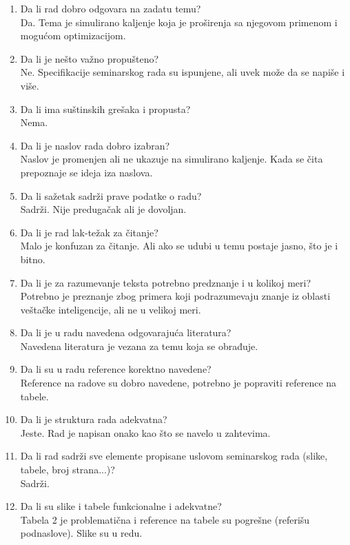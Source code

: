 \documentclass[a4paper]{report}
\begin{document}
\begin{enumerate}
\item Da li rad dobro odgovara na zadatu temu?\\
Da. Tema je simulirano kaljenje koja je proširenja sa njegovom primenom i mogućom optimizacijom.
\item Da li je nešto važno propušteno?\\
Ne. Specifikacije seminarskog rada su ispunjene, ali uvek može da se napiše i više.
\item Da li ima suštinskih grešaka i propusta?\\
Nema.
\item Da li je naslov rada dobro izabran?\\
Naslov je promenjen ali ne ukazuje na simulirano kaljenje. Kada se čita prepoznaje se ideja iza naslova.
\item Da li sažetak sadrži prave podatke o radu?\\
Sadrži. Nije predugačak ali je dovoljan.
\item Da li je rad lak-težak za čitanje?\\
Malo je konfuzan za čitanje. Ali ako se udubi u temu postaje jasno, što je i bitno.
\item Da li je za razumevanje teksta potrebno predznanje i u kolikoj meri?\\
Potrebno je preznanje zbog primera koji podrazumevaju znanje iz oblasti veštačke inteligencije, ali ne u velikoj meri.
\item Da li je u radu navedena odgovarajuća literatura?\\
Navedena literatura je vezana za temu koja se obrađuje.
\item Da li su u radu reference korektno navedene?\\
Reference na radove su dobro navedene, potrebno je popraviti reference na tabele.
\item Da li je struktura rada adekvatna?\\
Jeste. Rad je napisan onako kao što se navelo u zahtevima. 
\item Da li rad sadrži sve elemente propisane uslovom seminarskog rada (slike, tabele, broj strana...)?\\
Sadrži. 
\item Da li su slike i tabele funkcionalne i adekvatne?\\
Tabela 2 je problematična i reference na tabele su pogrešne (referišu podnaslove).
Slike su u redu.
\end{enumerate}
\end{document}
